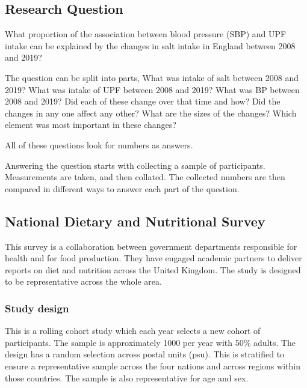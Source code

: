 \documentclass[
]{article}
\begin{document}
\hypertarget{research-question}{%
\subsection{Research Question}\label{research-question}}

What proportion of the association between blood pressure (SBP) and UPF
intake can be explained by the changes in salt intake in England between
2008 and 2019?

The question can be split into parts, What was intake of salt between
2008 and 2019? What was intake of UPF between 2008 and 2019? What was BP
between 2008 and 2019? Did each of these change over that time and how?
Did the changes in any one affect any other? What are the sizes of the
changes? Which element was most important in these changes?

All of these questions look for numbers as answers.

Answering the question starts with collecting a sample of participants.
Measurements are taken, and then collated. The collected numbers are
then compared in different ways to answer each part of the question.

\hypertarget{national-dietary-and-nutritional-survey}{%
\subsection{National Dietary and Nutritional
Survey}\label{national-dietary-and-nutritional-survey}}

This survey is a collaboration between government departments
responsible for health and for food production. They have engaged
academic partners to deliver reports on diet and nutrition across the
United Kingdom. The study is designed to be representative across the
whole area.

\hypertarget{study-design}{%
\subsubsection{Study design}\label{study-design}}

This is a rolling cohort study which each year selects a new cohort of
participants. The sample is approximately 1000 per year with 50\%
adults. The design has a random selection across postal units (psu).
This is stratified to ensure a representative sample across the four
nations and across regions within those countries. The sample is also
representative for age and sex.
\end{document}
